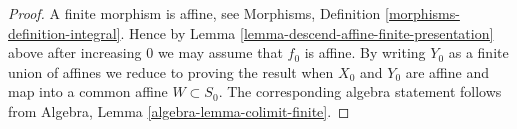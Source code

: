 \documentclass[10pt,a4paper]{amsart}
\theoremstyle{plain}
\theoremstyle{definition}
\theoremstyle{remark}
\numberwithin{equation}{subsection}
\begin{document}
\begin{proof}
A finite morphism is affine, see
Morphisms, Definition \ref{morphisms-definition-integral}.
Hence by Lemma \ref{lemma-descend-affine-finite-presentation} above
after increasing $0$ we may assume that $f_0$ is affine.
By writing $Y_0$ as a finite union of affines we reduce to proving
the result when $X_0$ and $Y_0$ are affine and map
into a common affine $W \subset S_0$. The corresponding algebra
statement follows from Algebra, Lemma \ref{algebra-lemma-colimit-finite}.
\end{proof}
\end{document}
